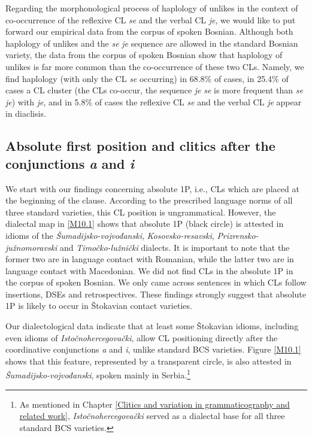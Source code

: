 Regarding the morphonological process of haplology of unlikes in the context of co-occurrence of the reflexive CL \textit{se} and the verbal CL \textit{je}, we would like to put forward our empirical data from the corpus of spoken Bosnian. Although both haplology of unlikes and the \textit{se} \textit{je} sequence are allowed in the standard Bosnian variety, the data from the corpus of spoken Bosnian show that haplology of unlikes is far more common than the co-occurrence of these two CLs. Namely, we find haplology (with only the CL \textit{se} occurring) in 68.8\% of cases, in 25.4\% of cases a CL cluster (the CLs co-occur, the sequence \textit{je} \textit{se} is more frequent than \textit{se} \textit{je}) with \textit{je}, and in 5.8\% of cases the reflexive CL \textit{se} and the verbal CL \textit{je} appear in diaclisis.

\largerpage
\subsection{Absolute first position and clitics after the conjunctions \textit{a} and \textit{i}}
\label{sec:10.2.3}
We start with our findings concerning absolute 1P, i.e., CLs which are placed at the beginning of the clause. According to the prescribed language norms of all three standard varieties, this CL position is ungrammatical. However, the dialectal map in \ref{M10.1} shows that absolute 1P (black circle) is attested in idioms of the \textit{Šumadijsko-vojvođanski}, \textit{Kosovsko-resavski}, \textit{Prizrensko-južnomoravski} and \textit{Ti\-moč\-ko-lužnički} dialects. It is important to note that the former two are in language contact with Romanian, while the latter two are in language contact with Macedonian. We did not find CLs in the absolute 1P in the corpus of spoken Bosnian. We only came across sentences in which CLs follow insertions, DSEs and retrospectives. These findings strongly suggest that absolute 1P is likely to occur in Štokavian contact varieties.

Our dialectological data indicate that at least some Štokavian idioms, including even idioms of \textit{Istočnohercegovački}, allow CL positioning directly after the coordinative conjunctions \textit{a} and \textit{i}, unlike standard BCS varieties. Figure \ref{M10.1} shows that this feature, represented by a transparent circle, is also attested in \textit{Šuma\-dij\-sko-vojvođanski}, spoken mainly in Serbia.\footnote{As mentioned in Chapter \ref{Clitics and variation in grammaticography and related work}, \textit{Istočnohercegovački} served as a dialectal base for all three standard BCS varieties.}

